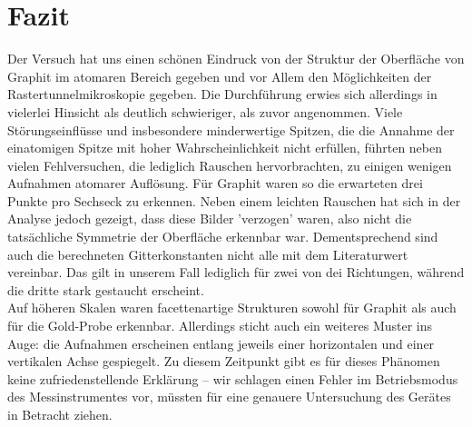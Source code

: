 \section{Fazit}
Der Versuch hat uns einen schönen Eindruck von der Struktur der Oberfläche 
von Graphit im atomaren Bereich gegeben und vor 
Allem den Möglichkeiten der Rastertunnelmikroskopie gegeben. Die Durchführung erwies 
sich allerdings in vielerlei Hinsicht als deutlich schwieriger, als 
zuvor angenommen. Viele Störungseinflüsse und insbesondere minderwertige Spitzen, 
die die Annahme der einatomigen Spitze mit hoher Wahrscheinlichkeit nicht erfüllen, 
führten neben vielen Fehlversuchen, die lediglich Rauschen hervorbrachten, zu einigen 
wenigen Aufnahmen atomarer Auflösung. Für Graphit waren so die erwarteten drei Punkte 
pro Sechseck zu erkennen. Neben einem leichten Rauschen hat sich in der Analyse jedoch 
gezeigt, dass diese Bilder 'verzogen' waren, also nicht die tatsächliche Symmetrie 
der Oberfläche erkennbar war. Dementsprechend sind auch die berechneten Gitterkonstanten 
nicht alle mit dem Literaturwert vereinbar. Das gilt in unserem Fall lediglich für 
zwei von dei Richtungen, während die dritte stark gestaucht erscheint. \\ 

Auf höheren Skalen waren facettenartige Strukturen sowohl für Graphit als auch für 
die Gold-Probe erkennbar. Allerdings sticht auch ein weiteres Muster ins Auge: die Aufnahmen 
erscheinen entlang jeweils einer horizontalen und einer vertikalen Achse gespiegelt. 
Zu diesem Zeitpunkt gibt es für dieses Phänomen keine zufriedenstellende Erklärung – 
wir schlagen einen Fehler im Betriebsmodus des Messinstrumentes vor, müssten für eine 
genauere Untersuchung des Gerätes in Betracht ziehen. 


